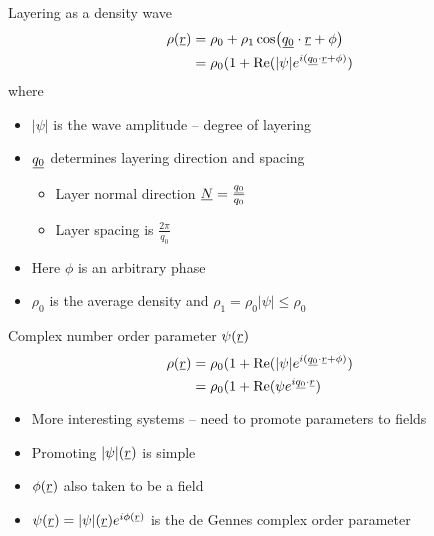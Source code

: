 \documentclass[10pt,mathserif]{beamer}
\newcommand{\suf}[2]{\stackunder[0.5pt]{\stackunder[1pt]{\ensuremath{#1}}{\rule{\widthof{\ensuremath{#2}}*\real{0.9}}{.1ex}}}{}}
\newcommand{\su}[1]{\suf{#1}{#1}}
\newcommand{\ssu}[1]{\scriptsize\su{#1}\normalsize}
\newcommand{\NN}{\ensuremath{\su{N}}}
\newcommand{\extra}[1]{\color{gray} #1 \normalcolor}
\begin{document}
\begin{frame}[fragile]{Layering as a density wave}
    \newrefsection
    \vspace{-1em}
    \begin{align*}
        \rho(\su{r}) &= \rho_0 + \rho_1\cos(\su{q_0}\cdot\su{r} + \phi) \\
        &= \rho_0 (1 + \Re(|\psi| e^{i(\ssu{q_0} \cdot \ssu{r} + \phi)})
    \end{align*}
    where
    \begin{itemize}
        \item $|\psi|$ is the wave amplitude -- degree of layering
        \item $\su{q_0}$ determines layering direction and spacing
        \begin{itemize}
            \item Layer normal direction $\NN=\frac{\ssu{q_0}}{q_0}$
            \item Layer spacing is $\frac{2\pi}{q_0}$
        \end{itemize}
        \item Here $\phi$ is an arbitrary phase
        \extra{\item $\rho_0$ is the average density and $\rho_1=\rho_0|\psi| \leq \rho_0$}
    \end{itemize}
\end{frame}

\begin{frame}[fragile]{Complex number order parameter $\psi(\su{r})$}
    \newrefsection
    \vspace{-\fill}
    \begin{align*}
        \rho(\su{r}) &= \rho_0 (1 + \Re(|\psi| e^{i(\ssu{q_0} \cdot \ssu{r} + \phi)}) \\
        &= \rho_0 (1 + \Re(\psi e^{i\ssu{q_0} \cdot \ssu{r}})
    \end{align*}
    \vspace{\fill}
    \begin{itemize}
        \item More interesting systems -- need to promote parameters to fields
        \item Promoting $|\psi|(\su{r})$ is simple
        \item $\phi(\su{r})$ also taken to be a field
        \item $\psi(\su{r}) = |\psi|(\su{r})e^{i\phi(\ssu{r})}$ is the de Gennes complex order parameter
    \end{itemize}
    \vspace{\fill}
    \printbibliography[heading=none]
    \vspace{-\fill}
\end{frame}
\end{document}
